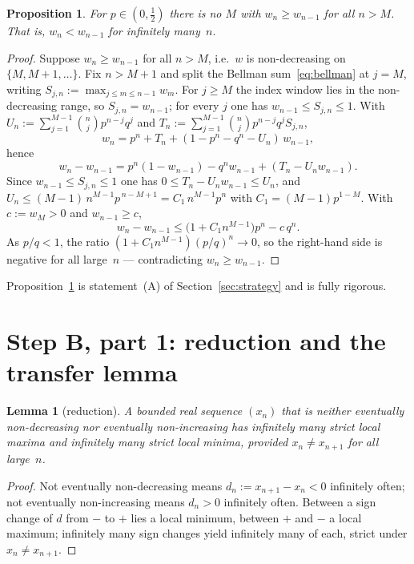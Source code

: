 \documentclass[11pt]{article}
\newtheorem{proposition}[theorem]{Proposition}
\newtheorem{lemma}[theorem]{Lemma}
\theoremstyle{definition}
\begin{document}
\begin{proposition}\label{prop:A}
  For $p\in(0,\tfrac12)$ there is no $M$ with $w_n\ge w_{n-1}$ for all
  $n>M$. That is, $w_n<w_{n-1}$ for infinitely many~$n$.
\end{proposition}

\begin{proof}
  Suppose $w_n\ge w_{n-1}$ for all $n>M$, i.e.\ $w$ is non-decreasing
  on $\{M,M+1,\dots\}$. Fix $n>M+1$ and split the Bellman
  sum~\eqref{eq:bellman} at $j=M$, writing $S_{j,n}:=\max_{j\le m\le
  n-1}w_m$. For $j\ge M$ the index window lies in the
  non-decreasing range, so $S_{j,n}=w_{n-1}$; for every $j$ one has
  $w_{n-1}\le S_{j,n}\le1$. With $U_n:=\sum_{j=1}^{M-1}\binom nj
  p^{n-j}q^j$ and $T_n:=\sum_{j=1}^{M-1}\binom nj p^{n-j}q^j S_{j,n}$,
  \[
    w_n=p^n+T_n+(1-p^n-q^n-U_n)\,w_{n-1},
  \]
  hence
  \[
    w_n-w_{n-1}=p^n(1-w_{n-1})-q^n w_{n-1}+(T_n-U_n w_{n-1}).
  \]
  Since $w_{n-1}\le S_{j,n}\le1$ one has $0\le T_n-U_nw_{n-1}\le U_n$,
  and $U_n\le(M-1)\,n^{M-1}p^{\,n-M+1}=C_1\,n^{M-1}p^n$ with
  $C_1=(M-1)p^{1-M}$. With $c:=w_M>0$ and $w_{n-1}\ge c$,
  \[
    w_n-w_{n-1}\le\bigl(1+C_1n^{M-1}\bigr)p^n-c\,q^n .
  \]
  As $p/q<1$, the ratio $(1+C_1n^{M-1})(p/q)^n\to0$, so the
  right-hand side is negative for all large~$n$ --- contradicting
  $w_n\ge w_{n-1}$.
\end{proof}

Proposition~\ref{prop:A} is statement~(A) of Section~\ref{sec:strategy}
and is fully rigorous.

\section{Step B, part 1: reduction and the transfer
  lemma}\label{sec:transfer}

\begin{lemma}[reduction]\label{lem:reduction}
  A bounded real sequence $(x_n)$ that is neither eventually
  non-decreasing nor eventually non-increasing has infinitely many
  strict local maxima and infinitely many strict local minima,
  provided $x_n\ne x_{n+1}$ for all large~$n$.
\end{lemma}

\begin{proof}
  Not eventually non-decreasing means $d_n:=x_{n+1}-x_n<0$ infinitely
  often; not eventually non-increasing means $d_n>0$ infinitely
  often. Between a sign change of $d$ from $-$ to $+$ lies a local
  minimum, between $+$ and $-$ a local maximum; infinitely many sign
  changes yield infinitely many of each, strict under $x_n\ne x_{n+1}$.
\end{proof}
\end{document}
